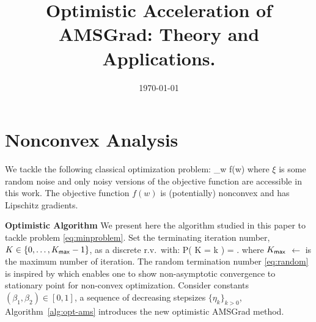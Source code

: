\documentclass[11pt]{article}
\theoremstyle{k}
\begin{document}
\title{Optimistic Acceleration of AMSGrad: Theory and Applications.}
\date{\today}

\maketitle


\section{Nonconvex Analysis}
We tackle the following classical optimization problem:
\beq\label{eq:minproblem}
\min \limits_{w \in \Theta} f(w) \eqdef \EE[ f(w, \xi)]
\eeq
where $\xi$ is some random noise and only noisy versions of the objective function are accessible in this work.
The objective function $f(w)$ is (potentially) nonconvex and has Lipschitz gradients.

\textbf{Optimistic Algorithm}
We present here the algorithm studied in this paper to tackle problem \eqref{eq:minproblem}.
Set the terminating iteration number, $K \in \{0,\dots,K_{\sf max}-1\}$, as a discrete r.v.~with:
\beq \label{eq:random}
   P( K = k ) = .
\eeq
where $K_{\sf max}$ $\leftarrow$ is the maximum number of iteration.
The random termination number \eqref{eq:random} is inspired by \citep{ghadimi2013stochastic} which enables one to show non-asymptotic convergence to stationary point for non-convex optimization. 
Consider constants $(\beta_1, \beta_2) \in [0,1]$, a sequence of decreasing stepsizes $\{\eta_k\}_{k>0}$, Algorithm~\ref{alg:opt-ams} introduces the new optimistic AMSGrad method.
\end{document}
